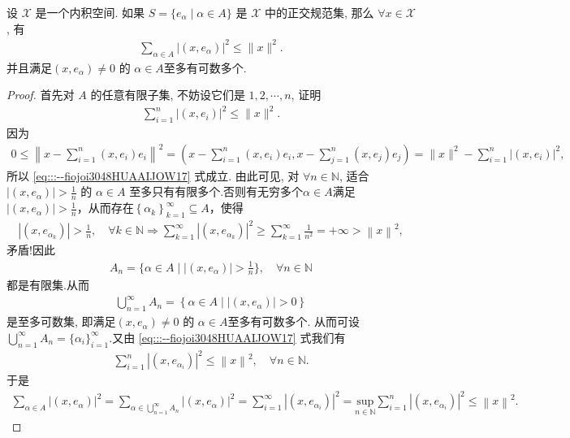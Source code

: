 \documentclass[../../main.tex]{subfiles}%
\begin{document}
\begin{theorem}[Bessel不等式]\label{theorem:泛函分析---Bessel不等式}
设 $\mathscr{X}$ 是一个内积空间. 如果 $S=\{e_\alpha\mid\alpha\in A\}$ 是 $\mathscr{X}$ 中的正交规范集, 那么 $\forall x\in\mathscr{X}$, 有
\begin{align}
\sum\limits_{\alpha\in A}|(x,e_\alpha)|^2\leqslant\|x\|^2.\label{eq:::--fiojoi3048HUAAIJOW16}
\end{align}
并且满足$(x,e_\alpha)\neq 0$ 的 $\alpha\in A$至多有可数多个. 
\end{theorem}
\begin{proof}
首先对 $A$ 的任意有限子集, 不妨设它们是 $1,2,\cdots,n$, 证明
\begin{align}
\sum\limits_{i=1}^n|(x,e_i)|^2\leqslant\|x\|^2.\label{eq:::--fiojoi3048HUAAIJOW17}
\end{align}
因为
\begin{align*}
0\leqslant\left\|x-\sum\limits_{i=1}^n(x,e_i)e_i\right\|^2
=\left(x-\sum\limits_{i=1}^n(x,e_i)e_i,x-\sum\limits_{j=1}^n(x,e_j)e_j\right)=\|x\|^2-\sum\limits_{i=1}^n|(x,e_i)|^2,
\end{align*}
所以 \eqref{eq:::--fiojoi3048HUAAIJOW17} 式成立. 由此可见, 对 $\forall n\in\mathbb{N}$, 适合 $|(x,e_\alpha)|>\frac{1}{n}$ 的 $\alpha\in A$ 至多只有有限多个.否则有无穷多个$\alpha \in A$满足$\left| \left( x,e_{\alpha} \right) \right|>\frac{1}{n}$，从而存在$\left\{ \alpha _k \right\} _{k=1}^{\infty}\subseteq A$，使得
\begin{align*}
\left| \left( x,e_{\alpha _k} \right) \right|>\frac{1}{n},\quad \forall k\in \mathbb{N} \Longrightarrow \sum\limits_{k=1}^{\infty}{\left| \left( x,e_{\alpha _k} \right) \right|^2}\geqslant \sum\limits_{k=1}^{\infty}{\frac{1}{n^2}}=+\infty >\left\| x \right\| ^2,
\end{align*}
矛盾!因此
\begin{align*}
A_n=\{\alpha \in A\mid \left| \left( x,e_{\alpha} \right) \right|>\frac{1}{n}\},\quad \forall n\in \mathbb{N}
\end{align*}
都是有限集.从而
\begin{align*}
\bigcup_{n=1}^{\infty}{A_n}=\left\{ \alpha \in A\mid \left| \left( x,e_{\alpha} \right) \right|>0 \right\} 
\end{align*}
是至多可数集,
即满足$(x,e_\alpha)\neq 0$ 的 $\alpha\in A$至多有可数多个. 从而可设$\bigcup_{n=1}^{\infty}{A_n}=\{\alpha_i\}_{i=1}^{\infty}$.又由 \eqref{eq:::--fiojoi3048HUAAIJOW17} 式我们有
\begin{align*}
\sum_{i=1}^n{\left| \left( x,e_{\alpha _i} \right) \right|^2}\leqslant \left\| x \right\| ^2,\quad \forall n\in \mathbb{N} .
\end{align*}
于是
\begin{align*}
\sum_{\alpha \in A}{\left| \left( x,e_{\alpha} \right) \right|^2}=\sum_{\alpha \in \bigcup_{n=1}^{\infty}{A_n}}{\left| \left( x,e_{\alpha} \right) \right|^2}=\sum_{i=1}^{\infty}{\left| \left( x,e_{\alpha _i} \right) \right|^2}=\underset{n\in \mathbb{N}}{\mathrm{sup}}\sum_{i=1}^n{\left| \left( x,e_{\alpha _i} \right) \right|^2}\leqslant \left\| x \right\| ^2.
\end{align*}
\end{proof}
\end{document}
